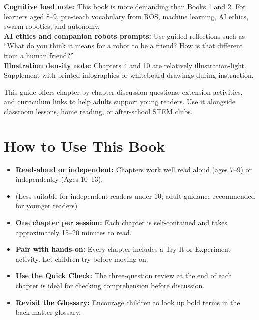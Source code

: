 

\begin{tcolorbox}[enhanced,colback=SunYellow!12,colframe=RoboGreen!60!black,arc=6pt,boxrule=1pt,left=10pt,right=10pt,top=8pt,bottom=8pt]
\textbf{Cognitive load note:} This book is more demanding than Books 1 and 2. For learners aged 8--9, pre-teach vocabulary from ROS, machine learning, AI ethics, swarm robotics, and autonomy.\\
\textbf{AI ethics and companion robots prompts:} Use guided reflections such as ``What do you think it means for a robot to be a friend? How is that different from a human friend?''\\
\textbf{Illustration density note:} Chapters 4 and 10 are relatively illustration-light. Supplement with printed infographics or whiteboard drawings during instruction.
\end{tcolorbox}

This guide offers chapter-by-chapter discussion questions, extension
activities, and curriculum links to help adults support young readers.
Use it alongside classroom lessons, home reading, or after-school STEM clubs.

\sectionrule

\section*{How to Use This Book}

\begin{itemize}
  \item \textbf{Read-aloud or independent:} Chapters work well read aloud (ages 7--9)
    or independently (Ages 10--13).
  \item (Less suitable for independent readers under 10; adult guidance recommended for younger readers)
  \item \textbf{One chapter per session:} Each chapter is self-contained and takes
    approximately 15--20 minutes to read.
  \item \textbf{Pair with hands-on:} Every chapter includes a Try It or Experiment
    activity. Let children try before moving on.
  \item \textbf{Use the Quick Check:} The three-question review at the end of each
    chapter is ideal for checking comprehension before discussion.
  \item \textbf{Revisit the Glossary:} Encourage children to look up bold terms
    in the back-matter glossary.
\end{itemize}

